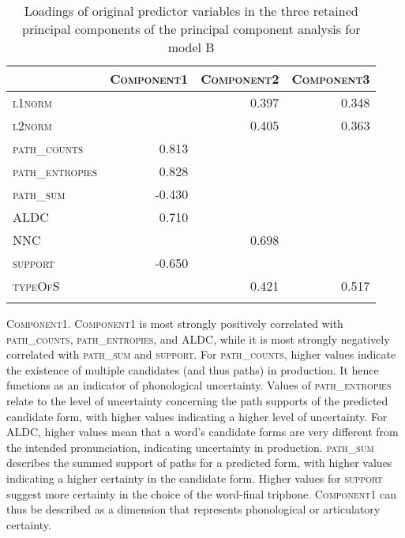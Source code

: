 \begin{table}\fontsize{10}{11}
\caption{Loadings of original predictor variables in the three retained principal components of the principal component analysis for model B}
\label{tab:5.5}
\centering
\begin{tabular}{lrrr} 
\lsptoprule
~               & \textsc{Component1} & \textsc{Component2} & \textsc{Component3}  \\ 
\midrule
\textsc{l1norm}          & ~          & 0.397      & 0.348       \\
\textsc{l2norm}          & ~          & 0.405      & 0.363       \\
\textsc{path\_counts}    & 0.813      & ~          & ~           \\
\textsc{path\_entropies} & 0.828      & ~          & ~           \\
\textsc{path\_sum}       & -0.430     & ~          & ~           \\
\textsc{ALDC}            & 0.710      & ~          & ~           \\
\textsc{NNC}             & ~          & 0.698      & ~           \\
\textsc{support}         & -0.650     & ~          & ~           \\
\textsc{typeOfS}           & ~          & 0.421      & 0.517       \\
\lspbottomrule
\end{tabular}
\end{table}

\textsc{Component1}. \textsc{Component1} is most strongly positively correlated with \textsc{path\_counts}, \textsc{path\_entropies}, and \textsc{ALDC}, while it is most strongly negatively correlated with \textsc{path\_sum} and \textsc{support}. For \textsc{path\_counts}, higher values indicate the existence of multiple candidates (and thus paths) in production. It hence functions as an indicator of phonological uncertainty. Values of \textsc{path\_entropies} relate to the level of uncertainty concerning the path supports of the predicted candidate form, with higher values indicating a higher level of uncertainty. For \textsc{ALDC}, higher values mean that a word’s candidate forms are very different from the intended pronunciation, indicating uncertainty in production. \textsc{path\_sum} describes the summed support of paths for a predicted form, with higher values indicating a higher certainty in the candidate form. Higher values for \textsc{support} suggest more certainty in the choice of the word-final triphone. \textsc{Component1} can thus be described as a dimension that represents phonological or articulatory certainty.

